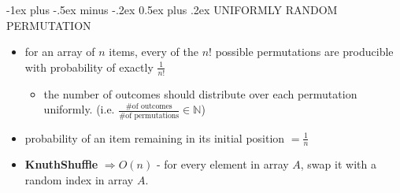 \documentclass[10pt, landscape]{article}
\makeatletter
\let\Then\Rightarrow
\renewcommand{\section}{\@startsection{section}{1}{0mm}%
                                {-1ex plus -.5ex minus -.2ex}%
                                {0.5ex plus .2ex}%
                                {\normalfont\large\bfseries}}
\makeatother
\begin{document}
\begin{multicols}{4}
\section{UNIFORMLY RANDOM PERMUTATION}
\begin{itemize}
    \item for an array of $n$ items, every of the $n!$ possible permutations are producible with probability of exactly $\frac{1}{n!}$
    \begin{itemize}
        \item the number of outcomes should distribute over each permutation uniformly. (i.e. $\frac{\text{\# of outcomes}}{\text{\# of permutations}} \in \mathbb{N}$)
    \end{itemize}
    \item probability of an item remaining in its initial position $= \frac{1}{n}$
    \item \textbf{KnuthShuffle} $\Then O(n)$ - for every element in array $A$, swap it with a random index in array $A$. 
\end{itemize}

  
\end{multicols}

\hrulefill \\
\end{document}
